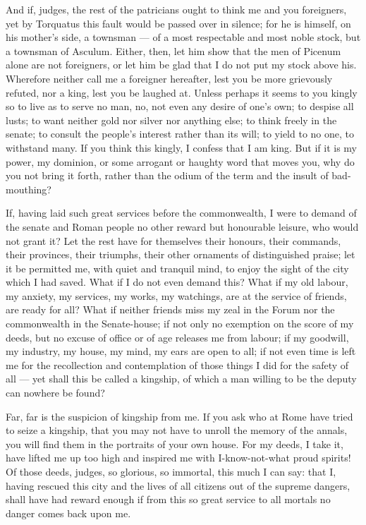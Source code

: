  And if, judges, the rest of the patricians ought to think me and you foreigners, yet by Torquatus this fault would be passed over in silence; for he is himself, on his mother's side, a townsman --- of a most respectable and most noble stock, but a townsman of Asculum. Either, then, let him show that the men of Picenum alone are not foreigners, or let him be glad that I do not put my stock above his. Wherefore neither call me a foreigner hereafter, lest you be more grievously refuted, nor a king, lest you be laughed at. Unless perhaps it seems to you kingly so to live as to serve no man, no, not even any desire of one's own; to despise all lusts; to want neither gold nor silver nor anything else; to think freely in the senate; to consult the people's interest rather than its will; to yield to no one, to withstand many. If you think this kingly, I confess that I am king. But if it is my power, my dominion, or some arrogant or haughty word that moves you, why do you not bring it forth, rather than the odium of the term and the insult of bad-mouthing?

 If, having laid such great services before the commonwealth, I were to demand of the senate and Roman people no other reward but honourable leisure, who would not grant it? Let the rest have for themselves their honours, their commands, their provinces, their triumphs, their other ornaments of distinguished praise; let it be permitted me, with quiet and tranquil mind, to enjoy the sight of the city which I had saved. What if I do not even demand this? What if my old labour, my anxiety, my services, my works, my watchings, are at the service of friends, are ready for all? What if neither friends miss my zeal in the Forum nor the commonwealth in the Senate-house; if not only no exemption on the score of my deeds, but no excuse of office or of age releases me from labour; if my goodwill, my industry, my house, my mind, my ears are open to all; if not even time is left me for the recollection and contemplation of those things I did for the safety of all --- yet shall this be called a kingship, of which a man willing to be the deputy can nowhere be found?

 Far, far is the suspicion of kingship from me. If you ask who at Rome have tried to seize a kingship, that you may not have to unroll the memory of the annals, you will find them in the portraits of your own house. For my deeds, I take it, have lifted me up too high and inspired me with I-know-not-what proud spirits! Of those deeds, judges, so glorious, so immortal, this much I can say: that I, having rescued this city and the lives of all citizens out of the supreme dangers, shall have had reward enough if from this so great service to all mortals no danger comes back upon me.

